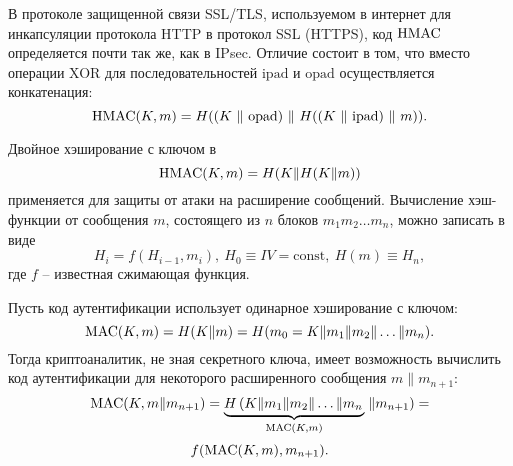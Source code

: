 В протоколе защищенной связи SSL/TLS, используемом в интернет для инкапсуляции протокола HTTP в протокол SSL (HTTPS), код $\textrm{HMAC}$ определяется почти так же, как в IPsec. Отличие состоит в том, что вместо операции XOR для последовательностей $\textrm{ipad}$ и $\textrm{opad}$ осуществляется конкатенация:
    \[ \textrm{HMAC}(K, m) = H((K ~\|~ \textrm{opad}) ~\|~ H((K ~\|~ \textrm{ipad}) ~\|~ m)). \]

Двойное хэширование с ключом в
    \[ \textrm{HMAC}(K, m) = H(K \| H(K \| m)) \]
применяется для защиты от атаки на расширение сообщений. Вычисление хэш-функции от сообщения $m$, состоящего из $n$ блоков $m_1 m_2 \dots m_n$, можно записать в виде
    \[ H_i = f(H_{i-1}, m_i), ~ H_0 \equiv IV = \textrm{const}, ~ H(m) \equiv H_n, \]
где $f$ -- известная сжимающая функция.

Пусть код аутентификации использует одинарное хэширование с ключом:
    \[ \textrm{MAC}(K, m) = H(K \| m) = H (m_0 = K \| m_1 \| m_2 \| \dots \| m_n). \]
Тогда криптоаналитик, не зная секретного ключа, имеет возможность вычислить код аутентификации для некоторого расширенного сообщения $m \| m_{n+1}$:
\[
    \textrm{MAC}(K, m \| m_{n+1}) = \underbrace{H \left( K \| m_1 \| m_2 \| \dots \| m_n \right.}_{\textrm{MAC}(K, m)} \left. \| m_{n+1} \right) =
\] \[
    f(\textrm{MAC}(K, m), m_{n+1}).
\]
